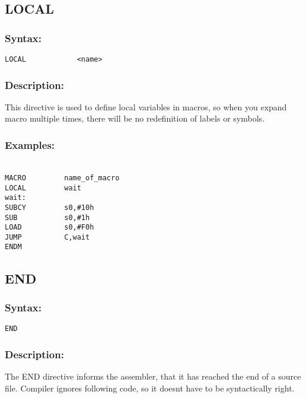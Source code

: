     \subsection{LOCAL}
        \subsubsection{Syntax:}
            \verb'LOCAL            <name>'

        \subsubsection{Description:}
            This directive is used to define local variables in macros, so when you expand macro multiple times, there will be no redefinition of labels or symbols.

        \subsubsection{Examples:}
            {
            ~\\
            \usecodefont
                \verb'MACRO         name_of_macro'\\
                \verb'LOCAL         wait'\\
                \verb'wait:'\\
                \verb'SUBCY         s0,#10h'\\
                \verb'SUB           s0,#1h' \\
                \verb'LOAD          s0,#F0h'\\
                \verb'JUMP          C,wait'\\
                \verb'ENDM'\\
            }
            
    \subsection{END}
        \subsubsection{Syntax:}
            \verb'END'

        \subsubsection{Description:}
        The END directive informs the assembler, that it has reached the end of a source file. Compiler ignores following code, so it doesnt have to be
        syntactically right.

